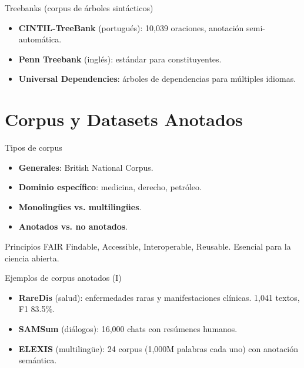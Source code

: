 \documentclass[aspectratio=169, 10pt, xcolor=table]{beamer}
\begin{document}
\begin{frame}{Treebanks (corpus de árboles sintácticos)}
    \begin{itemize}
        \item \textbf{CINTIL-TreeBank} (portugués): 10,039 oraciones, anotación semi-automática.
        \item \textbf{Penn Treebank} (inglés): estándar para constituyentes.
        \item \textbf{Universal Dependencies}: árboles de dependencias para múltiples idiomas.
    \end{itemize}
\end{frame}

\section{Corpus y Datasets Anotados}

\begin{frame}{Tipos de corpus}
    \begin{itemize}
        \item \textbf{Generales}: British National Corpus.
        \item \textbf{Dominio específico}: medicina, derecho, petróleo.
        \item \textbf{Monolingües vs. multilingües}.
        \item \textbf{Anotados vs. no anotados}.
    \end{itemize}
    \vspace{0.3cm}
    \begin{block}{Principios FAIR}
        Findable, Accessible, Interoperable, Reusable. Esencial para la ciencia abierta.
    \end{block}
\end{frame}

\begin{frame}{Ejemplos de corpus anotados (I)}
    \begin{itemize}
        \item \textbf{RareDis} (salud): enfermedades raras y manifestaciones clínicas. 1,041 textos, F1 83.5\%.
        \item \textbf{SAMSum} (diálogos): 16,000 chats con resúmenes humanos.
        \item \textbf{ELEXIS} (multilingüe): 24 corpus (1,000M palabras cada uno) con anotación semántica.
    \end{itemize}
\end{frame}
\end{document}
